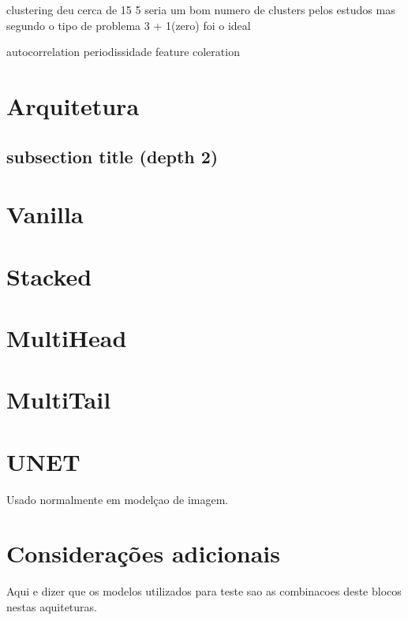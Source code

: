 clustering
	deu cerca de 15
	5 seria um bom numero de clusters pelos estudos
	mas segundo o tipo de problema 3 + 1(zero) foi o ideal

autocorrelation
	periodissidade
	feature coleration
\section{Arquitetura  \label{se:dados_tratamento}}

\subsection{subsection title (depth 2)}


\section{Vanilla  \label{se:dados_tratamento}}

\section{Stacked  \label{se:dados_tratamento}}


\section{MultiHead  \label{se:dados_tratamento}}
\section{MultiTail  \label{se:dados_tratamento}}


\section{UNET  \label{se:dados_tratamento}}

Usado normalmente em modelçao de imagem. 

\section{Considerações adicionais  \label{se:dados_plus}}

Aqui e dizer que os modelos utilizados para teste sao as combinacoes deste blocos nestas aquiteturas.

